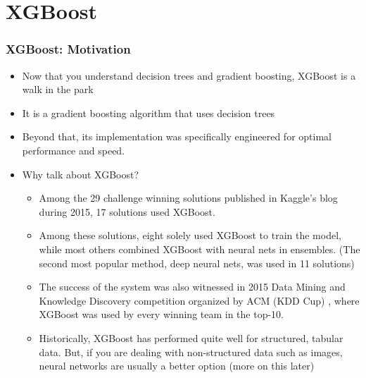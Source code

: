 \documentclass[
  shownotes,
  xcolor={svgnames},
  hyperref={colorlinks,citecolor=DarkBlue,linkcolor=DarkRed,urlcolor=DarkBlue}
  , aspectratio=169]{beamer}
\begin{document}
\section{XGBoost}
\begin{frame}[fragile]
\frametitle{XGBoost: Motivation}

\begin{itemize}


\item Now that you understand decision trees and gradient boosting,  XGBoost is a walk in the park
\item It is a gradient boosting algorithm that uses decision trees 
\item Beyond that, its implementation was specifically engineered for optimal performance and speed.



\item Why talk about XGBoost?
\begin{itemize}
\scriptsize

 \item Among the 29 challenge winning solutions published in Kaggle's blog during 2015, 17 solutions used XGBoost.  
 \item Among these solutions,  eight  solely  used  XGBoost  to  train  the  model, while most others combined XGBoost with neural nets in ensembles. (The second most popular method, deep  neural  nets,  was  used  in  11  solutions) 
 \item   The  success of the system was also witnessed in 2015 Data Mining and Knowledge Discovery competition organized by ACM (KDD Cup) , where XGBoost  was  used  by  every  winning  team  in  the  top-10. 
 \item Historically, XGBoost has performed quite well for structured, tabular data. But, if you are dealing with non-structured data such as images, neural networks are usually a better option (more on this later)
\end{itemize}
 \end{itemize}
\end{frame}
\end{document}
